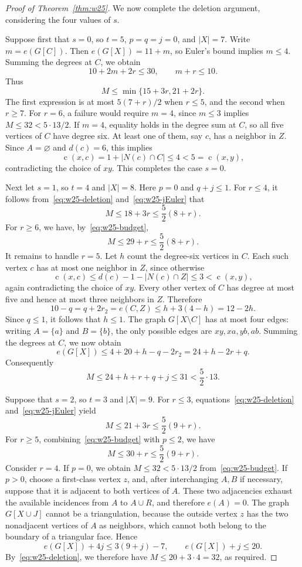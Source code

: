 \documentclass[11pt,a4paper]{article}
\theoremstyle{remark}
\newcommand{\cdeg}{\operatorname{c}}
\begin{document}
\begin{proof}[Proof of Theorem~\ref{thm:w25}]
We now complete the deletion argument, considering the four values of $s$.

Suppose first that $s=0$, so $t=5$, $p=q=j=0$, and $|X|=7$. Write $m=e(G[C])$. Then $e(G[X])=11+m$, so Euler's bound implies $m\le4$. Summing the degrees at $C$, we obtain
\[
10+2m+2r\le30,\qquad m+r\le10.
\]
Thus
\[
M\le\min\{15+3r,21+2r\}.
\]
The first expression is at most $5(7+r)/2$ when $r\le5$, and the second when $r\ge7$. For $r=6$, a failure would require $m=4$, since $m\le3$ implies $M\le32<5\cdot13/2$. If $m=4$, equality holds in the degree sum at $C$, so all five vertices of $C$ have degree six. At least one of them, say $c$, has a neighbor in $Z$. Since $A=\varnothing$ and $d(c)=6$, this implies
\[
\cdeg(x,c)=1+|N(c)\cap C|\le4<5=\cdeg(x,y),
\]
contradicting the choice of $xy$. This completes the case $s=0$.

Next let $s=1$, so $t=4$ and $|X|=8$. Here $p=0$ and $q+j\le1$. For $r\le4$, it follows from~\eqref{eq:w25-deletion} and~\eqref{eq:w25-jEuler} that
\[
M\le18+3r\le\frac52(8+r).
\]
For $r\ge6$, we have, by~\eqref{eq:w25-budget},
\[
M\le29+r\le\frac52(8+r).
\]
It remains to handle $r=5$. Let $h$ count the degree-six vertices in $C$. Each such vertex $c$ has at most one neighbor in $Z$, since otherwise
\[
\cdeg(x,c)\le d(c)-1-|N(c)\cap Z|\le3<\cdeg(x,y),
\]
again contradicting the choice of $xy$. Every other vertex of $C$ has degree at most five and hence at most three neighbors in $Z$. Therefore
\[
10-q=q+2r_2=e(C,Z)\le h+3(4-h)=12-2h.
\]
Since $q\le1$, it follows that $h\le1$. The graph $G[X\setminus C]$ has at most four edges: writing $A=\{a\}$ and $B=\{b\}$, the only possible edges are $xy,xa,yb,ab$. Summing the degrees at $C$, we now obtain
\[
e(G[X])\le4+20+h-q-2r_2=24+h-2r+q.
\]
Consequently
\[
M\le24+h+r+q+j\le31<\frac52\cdot13.
\]

Suppose that $s=2$, so $t=3$ and $|X|=9$. For $r\le3$, equations~\eqref{eq:w25-deletion} and~\eqref{eq:w25-jEuler} yield
\[
M\le21+3r\le\frac52(9+r).
\]
For $r\ge5$, combining~\eqref{eq:w25-budget} with $p\le2$, we have
\[
M\le30+r\le\frac52(9+r).
\]
Consider $r=4$. If $p=0$, we obtain $M\le32<5\cdot13/2$ from~\eqref{eq:w25-budget}. If $p>0$, choose a first-class vertex $z$, and, after interchanging $A,B$ if necessary, suppose that it is adjacent to both vertices of $A$. These two adjacencies exhaust the available incidences from $A$ to $A\cup R$, and therefore $e(A)=0$. The graph $G[X\cup J]$ cannot be a triangulation, because the outside vertex $z$ has the two nonadjacent vertices of $A$ as neighbors, which cannot both belong to the boundary of a triangular face. Hence
\[
e(G[X])+4j\le3(9+j)-7,
\qquad e(G[X])+j\le20.
\]
By~\eqref{eq:w25-deletion}, we therefore have $M\le20+3\cdot4=32$, as required.


\end{proof}
\end{document}
